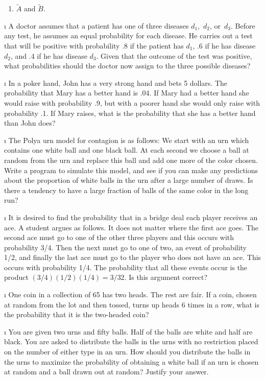 \begin{LJSItem}
\begin{enumerate}
\item $\tilde A$ and $\tilde B$.
\end{enumerate}

\i\label{exer 4.1.16} A doctor assumes that a patient has one of three diseases $d_1$,~$d_2$,
or~$d_3$.  Before any test, he assumes an equal probability for each disease. 
He carries out a test that will be positive with probability .8 if the patient
has $d_1$, .6 if he has disease $d_2$, and .4 if he has disease $d_3$.  Given that
the outcome of the test was positive, what probabilities should the doctor now
assign to the three possible diseases?

\i\label{exer 4.1.17} In a poker hand, John has a very strong hand and bets 5 dollars.  The
probability that Mary has a better hand is .04.  If Mary had a better hand she
would raise with probability .9, but with a poorer hand she would only raise
with probability .1.  If Mary raises, what is the probability that she has a
better hand than John does?

\i\label{exer 4.1.18} The Polya urn model for contagion is as follows: We
start with an urn which contains one white ball and one black ball.  At each
second we choose a ball at random from the urn and replace this ball and add one
more of the color chosen.  Write a program to simulate this model, and see if
you can make any predictions about the proportion of white balls in the urn
after a large number of draws.  Is there a tendency to have a large fraction of
balls of the same color in the long run?

\i\label{exer 4.1.19} It is desired to find the probability that in a bridge deal each player
receives an ace.  A student argues as follows.  It does not matter where the
first ace goes.  The second ace must go to one of the other three players and
this occurs with probability 3/4.  Then the next must go to one of two, an
event of probability 1/2, and finally the last ace must go to the player who
does not have an ace.  This occurs with probability 1/4.  The probability that
all these events occur is the product $(3/4)(1/2)(1/4) = 3/32$.  Is this
argument correct?

\i\label{exer 4.1.20} One coin in a collection of 65 has two heads.  The rest are fair.  If a
coin, chosen at random from the lot and then tossed, turns up heads 6 times in
a row, what is the probability that it is the two-headed coin?

\i\label{exer 4.1.21} You are given two urns and fifty balls.  Half of the balls are white and
half are black.  You are asked to distribute the balls in the urns with no
restriction placed on the number of either type in an urn.  How should you
distribute the balls in the urns to maximize the probability of obtaining a
white ball if an urn is chosen at random and a ball drawn out at random? 
Justify your answer.


\end{LJSItem}
